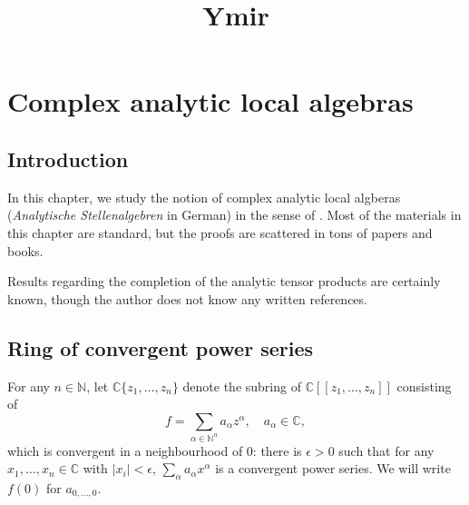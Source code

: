 




\title{Ymir}









%

\maketitle


\tableofcontents
\chapter*{Complex analytic local algebras}\label{chap-local}

\section{Introduction}\label{sec-introduction-Complexanalyticlocal}

In this chapter, we study the notion of complex analytic local algberas (\emph{Analytische Stellenalgebren} in German) in the sense of \cite{GR71}. Most of the materials in this chapter are standard, but the proofs are scattered in tons of papers and books.

Results regarding the completion of the analytic tensor products are certainly known, though the author does not know any written references.
\section{Ring of convergent power series}

\begin{definition}\label{def-ringconvpowerseries}
    For any $n\in \mathbb{N}$, let $\mathbb{C}\{ z_1,\ldots,z_n\}$ denote the subring of $\mathbb{C}[[z_1,\ldots,z_n]]$ consisting of
    \[
        f=\sum_{\alpha\in \mathbb{N}^n} a_{\alpha}z^{\alpha},\quad a_{\alpha}\in \mathbb{C},
    \]
    which is  convergent in a neighbourhood of $0$: there is $\epsilon>0$ such that for any $x_1,\ldots,x_n\in \mathbb{C}$ with $|x_i|<\epsilon$, $\sum_{\alpha}a_{\alpha} x^{\alpha}$ is a convergent power series. We will write $f(0)$ for $a_{0,\ldots,0}$.
\end{definition}

